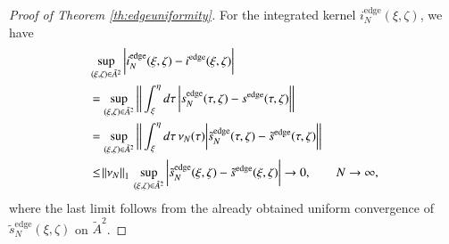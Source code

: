 \documentclass[11pt,reqno]{amsproc}
\numberwithin{equation}{section}
\numberwithin{theorem}{section}
\begin{document}
\begin{proof}[Proof of Theorem \ref{th:edgeuniformity}]
For the integrated kernel $i^{\mathrm{edge}}_{N}(\xi,\zeta)$, we have
\begin{align}
&\sup_{(\xi,\zeta) \in \tilde{A}^{2}}\bigg{|}i^{\mathrm{edge}}_{N}(\xi,\zeta)-i^{\mathrm{edge}}(\xi,\zeta)\bigg{|}\\
&= \sup_{(\xi,\zeta) \in \tilde{A}^{2}}\bigg{|}\bigg{|}\int_{\xi}^{\eta}d\tau\,\bigg{|}s^{\mathrm{edge}}_{N}(\tau,\zeta)-s^{\mathrm{edge}}(\tau,\zeta)\bigg{|}\bigg{|}\\
&= \sup_{(\xi,\zeta) \in \tilde{A}^{2}}\bigg{|}\bigg{|}\int_{\xi}^{\eta}d\tau\,\nu_{N}(\tau)\bigg{|}\tilde{s}^{\mathrm{edge}}_{N}(\tau,\zeta)-\tilde{s}^{\mathrm{edge}}(\tau,\zeta)\bigg{|}\bigg{|}\\
&\leq \norm{\nu_N}_{1}\,\sup_{(\xi,\zeta) \in \tilde{A}^{2}}\bigg{|}\tilde{s}^{\mathrm{edge}}_{N}(\xi,\zeta)-\tilde{s}^{\mathrm{edge}}(\xi,\zeta)\bigg{|} \to 0, \qquad N \to \infty,
\end{align}
where the last limit follows from the already obtained uniform convergence of $\tilde{s}^{\mathrm{edge}}_{N}(\xi,\zeta)$ on $\tilde{A}^{2}$.


\end{proof}
\end{document}
